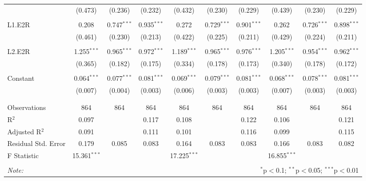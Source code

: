 \begin{table}[!htbp]
\begin{tabular}{@{\extracolsep{5pt}}lccccccccc}
  & (0.473) & (0.236) & (0.232) & (0.432) & (0.230) & (0.229) & (0.439) & (0.230) & (0.229) \\ 
  & & & & & & & & & \\ 
 L1.E2R & 0.208 & 0.747$^{***}$ & 0.935$^{***}$ & 0.272 & 0.729$^{***}$ & 0.901$^{***}$ & 0.262 & 0.726$^{***}$ & 0.898$^{***}$ \\ 
  & (0.461) & (0.230) & (0.213) & (0.422) & (0.225) & (0.211) & (0.429) & (0.224) & (0.211) \\ 
  & & & & & & & & & \\ 
 L2.E2R & 1.255$^{***}$ & 0.965$^{***}$ & 0.972$^{***}$ & 1.189$^{***}$ & 0.965$^{***}$ & 0.976$^{***}$ & 1.205$^{***}$ & 0.954$^{***}$ & 0.962$^{***}$ \\ 
  & (0.365) & (0.182) & (0.175) & (0.334) & (0.178) & (0.173) & (0.340) & (0.178) & (0.172) \\ 
  & & & & & & & & & \\ 
 Constant & 0.064$^{***}$ & 0.077$^{***}$ & 0.081$^{***}$ & 0.069$^{***}$ & 0.079$^{***}$ & 0.081$^{***}$ & 0.068$^{***}$ & 0.078$^{***}$ & 0.081$^{***}$ \\ 
  & (0.007) & (0.004) & (0.003) & (0.006) & (0.003) & (0.003) & (0.007) & (0.003) & (0.003) \\ 
  & & & & & & & & & \\ 
\hline \\[-1.8ex] 
Observations & 864 & 864 & 864 & 864 & 864 & 864 & 864 & 864 & 864 \\ 
R$^{2}$ & 0.097 &  & 0.117 & 0.108 &  & 0.122 & 0.106 &  & 0.121 \\ 
Adjusted R$^{2}$ & 0.091 &  & 0.111 & 0.101 &  & 0.116 & 0.099 &  & 0.115 \\ 
Residual Std. Error & 0.179 & 0.085 & 0.083 & 0.164 & 0.083 & 0.083 & 0.166 & 0.083 & 0.082 \\ 
F Statistic & 15.361$^{***}$ &  &  & 17.225$^{***}$ &  &  & 16.855$^{***}$ &  &  \\ 
\hline 
\hline \\[-1.8ex] 
\textit{Note:}  & \multicolumn{9}{r}{$^{*}$p$<$0.1; $^{**}$p$<$0.05; $^{***}$p$<$0.01} \\ 
\end{tabular} 
\end{table} 
